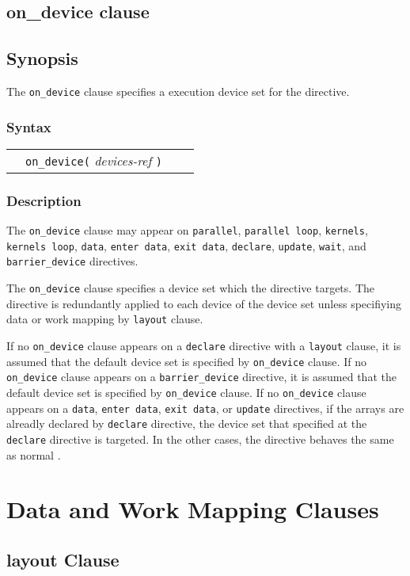 \subsection{on\_device clause}
\subsection*{Synopsis}
The {\tt on\_device} clause specifies a execution device set for the directive.

\subsubsection*{Syntax}
\begin{tabular}{llll}
             & \verb|on_device(| {\it devices-ref} \verb|)|\\
\end{tabular}

\subsubsection*{Description}
The {\tt on\_device} clause may appear on {\tt parallel}, {\tt parallel loop}, {\tt kernels}, {\tt kernels loop}, {\tt data}, {\tt enter data}, {\tt exit data}, {\tt declare}, {\tt update}, {\tt wait}, and {\tt barrier\_device} directives.

The {\tt on\_device} clause specifies a device set which the directive targets.
The directive is redundantly applied to each device of the device set unless specifiying data or work mapping by {\tt layout} clause.

If no {\tt on\_device} clause appears on a {\tt declare} directive with a {\tt layout} clause, it is assumed that the default device set is specified by {\tt on\_device} clause.
If no {\tt on\_device} clause appears on a {\tt barrier\_device} directive, it is assumed that the default device set is specified by {\tt on\_device} clause.
If no {\tt on\_device} clause appears on a {\tt data}, {\tt enter data}, {\tt exit data}, or {\tt update} directives, if the arrays are alreadly declared by {\tt declare} directive, the device set that specified at the {\tt declare} directive is targeted.
In the other cases, the directive behaves the same as normal {\OACC}.

\section{Data and Work Mapping Clauses}
\subsection{layout Clause}

